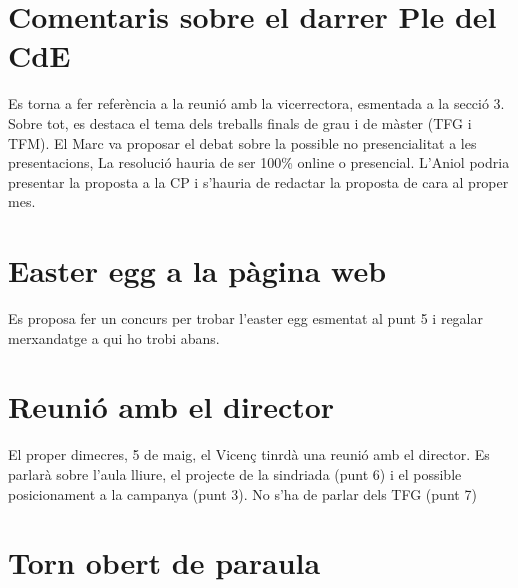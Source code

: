 \documentclass[12 pt,a4paper]{article}
\begin{document}
\section{Comentaris sobre el darrer Ple del CdE}

Es torna a fer referència a la reunió amb la vicerrectora, esmentada a la secció 3. Sobre tot, es destaca el tema dels treballs finals de grau i de màster (TFG i TFM). El Marc va proposar el debat sobre la possible no presencialitat a les presentacions, 
La resolució hauria de ser 100\% online o presencial. 
L’Aniol podria presentar la proposta a la CP i s’hauria de redactar la proposta de cara al proper mes.

\section{Easter egg a la pàgina web}

Es proposa fer un concurs per trobar l'easter egg esmentat al punt 5 i regalar merxandatge a qui ho trobi abans.

\section{Reunió amb el director}

El proper dimecres, 5 de maig, el Vicenç tinrdà una reunió amb el director. Es parlarà sobre l’aula lliure, el projecte de la sindriada (punt 6) i el possible posicionament a la campanya (punt 3). No s’ha de parlar dels TFG (punt 7)

\section{Torn obert de paraula}
\end{document}
